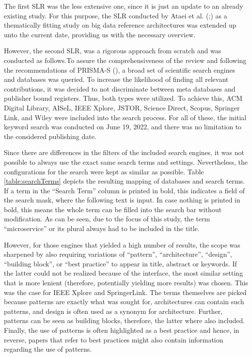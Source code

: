 \documentclass[conference]{IEEEtran}
\begin{document}
The first SLR was the less extensive one, since it is just an update to an already existing study. For this purpose, the SLR conducted by Ataei et al. (\cite{Ataei.2020};) as a thematically fitting study on big data reference architectures was extended up unto the current date, providing us with the necessary overview. 

However, the second SLR, was a rigorous approach from scratch and was conducted as follows.To assure the comprehensiveness of the review and following the recommendations of PRISMA-S (\cite{rethlefsen2021prisma}), a broad set of scientific search engines and databases was queried. To increase the likelihood of finding all relevant contributions, it was decided to not discriminate between meta databases and publisher bound registers. Thus, both types were utilized. To achieve this, ACM Digital Library, AISeL, IEEE Xplore, JSTOR, Science Direct, Scopus, Springer Link, and Wiley were included into the search process. For all of these, the initial keyword search was conducted on June 19, 2022, and there was no limitation to the considered publishing date.

Since there are differences in the filters of the included search engines, it was not possible to always use the exact same search terms and settings. Nevertheless, the configurations for the search were kept as similar as possible. Table \ref{table:searchTerms} depicts the resulting mapping of databases and search terms. If a term in the “Search Term” column is printed in bold, this indicates a field of the search mask, where the following text is input. In case nothing is printed in bold, this means the whole term can be filled into the search bar without modification. As can be seen, due to the focus of this study, the term “microservice” or its plural always had to be included in the title.

However, for those engines that yielded a high number of results, the scope was sharpened by also requiring variations of “pattern”, “architecture”, “design”, “building block”, or “best practice” to appear in title, abstract or keywords. If the latter could not be realized because of the interface, the most similar setting that is more lenient (therefore, potentially yielding more results) was chosen. This was the case for IEEE Xplore and SpringerLink. The terms themselves are picked because patterns are exactly what was sought for, architectures can contain such patterns, and design is often used as a synonym for architecture. Further, patterns can be seen as building blocks, therefore, the latter where also included. Finally, the use of patterns is often highlighted as a best practice and hence, in reverse, papers that refer to best practices might also contain information regarding the use of patterns. 
\end{document}
